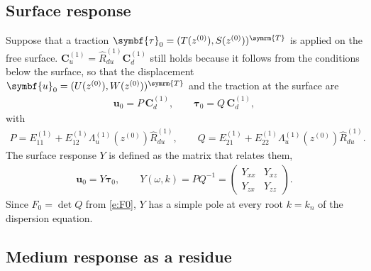 \documentclass[a4paper, 10pt]{article}
\begin{document}
\subsection{Surface response}

Suppose that a traction $\symbf{\tau}_0 = (T(z^{(0)}), S(z^{(0)}))^{\symrm{T}}$ is applied on the free surface.
$\symbf{C}_u^{(1)} = \hat{R}_{du}^{(1)} \symbf{C}_d^{(1)}$ still holds because it follows from the conditions below the surface, so that the displacement $\symbf{u}_0 = (U(z^{(0)}), W(z^{(0)}))^{\symrm{T}}$ and the traction at the surface are
\begin{align}
  \symbf{u}_0 = P\, \symbf{C}_d^{(1)}, \qquad
  \symbf{\tau}_0 = Q\, \symbf{C}_d^{(1)},
\end{align}
with
\begin{align}
  P = E_{11}^{(1)} + E_{12}^{(1)} \Lambda_u^{(1)}(z^{(0)}) \hat{R}_{du}^{(1)}, \qquad
  Q = E_{21}^{(1)} + E_{22}^{(1)} \Lambda_u^{(1)}(z^{(0)}) \hat{R}_{du}^{(1)}.
\end{align}
The surface response $Y$ is defined as the matrix that relates them,
\begin{align}
  \symbf{u}_0 = Y \symbf{\tau}_0, \qquad
  Y(\omega, k) = P Q^{-1} =
  \begin{pmatrix}
    Y_{xx} & Y_{xz} \\
    Y_{zx} & Y_{zz}
  \end{pmatrix}.
\end{align}
Since $F_0 = \det Q$ from \eqref{e:F0}, $Y$ has a simple pole at every root $k = k_n$ of the dispersion equation.

\subsection{Medium response as a residue}
\end{document}
